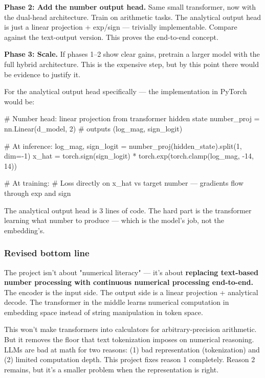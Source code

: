 \documentclass[11pt]{article}
\begin{document}
\textbf{Phase 2: Add the number output head.} Same small transformer, now with the dual-head architecture. Train on arithmetic tasks. The analytical output head is just a linear projection + exp/sign — trivially implementable. Compare against the text-output version. This proves the end-to-end concept.


\textbf{Phase 3: Scale.} If phases 1–2 show clear gains, pretrain a larger model with the full hybrid architecture. This is the expensive step, but by this point there would be evidence to justify it.


For the analytical output head specifically — the implementation in PyTorch would be:


\begin{CodeBlock}
# Number head: linear projection from transformer hidden state
number_proj = nn.Linear(d_model, 2)  # outputs (log_mag, sign_logit)

# At inference:
log_mag, sign_logit = number_proj(hidden_state).split(1, dim=-1)
x_hat = torch.sign(sign_logit) * torch.exp(torch.clamp(log_mag, -14, 14))

# At training:
# Loss directly on x_hat vs target number — gradients flow through exp and sign
\end{CodeBlock}


The analytical output head is 3 lines of code. The hard part is the transformer learning what number to produce — which is the model's job, not the embedding's.


\subsubsection*{Revised bottom line}


The project isn't about "numerical literacy" — it's about \textbf{replacing text-based number processing with continuous numerical processing end-to-end.} The encoder is the input side. The output side is a linear projection + analytical decode. The transformer in the middle learns numerical computation in embedding space instead of string manipulation in token space.


This won't make transformers into calculators for arbitrary-precision arithmetic. But it removes the floor that text tokenization imposes on numerical reasoning. LLMs are bad at math for two reasons: (1) bad representation (tokenization) and (2) limited computation depth. This project fixes reason 1 completely. Reason 2 remains, but it's a smaller problem when the representation is right.
\end{document}
